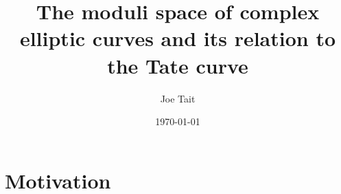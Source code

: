 \documentclass{beamer}
\title[The Tate Curve]{The moduli space of complex elliptic curves and its relation to the Tate curve} %
\author{Joe Tait} %
\institute[] %
{
University of Southampton \\ %
\medskip
\textit{joe.tait@soton.ac.uk} %
}
\date{\today} %
\begin{document}
\frame{
\titlepage %
}



\section{Motivation} %

\subsection{} %
\end{document}

